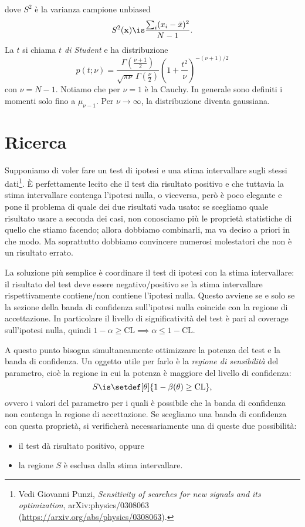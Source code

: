 dove $S^2$ è la varianza campione unbiased
\begin{equation*}
	S^2(\mathbf x)
	\is \frac {\sum_i (x_i-\bar x)^2} {N-1}.
\end{equation*}
La $t$ si chiama \emph{$t$ di Student} e ha distribuzione
\begin{equation*}
	p(t;\nu)
	= \frac {\Gamma\left(\frac{\nu+1}2\right)} {\sqrt{\pi\nu}\, \Gamma\left(\frac\nu2\right)}
	\left(1+\frac{t^2}\nu\right)^{-(\nu+1)/2}
\end{equation*}
con $\nu=N-1$.
Notiamo che per $\nu=1$ è la Cauchy.
In generale sono definiti i momenti solo fino a $\mu_{\nu-1}$.
Per $\nu\to\infty$, la distribuzione diventa gaussiana.

\section{Ricerca}

Supponiamo di voler fare un test di ipotesi e una stima intervallare sugli stessi dati\footnote{Vedi Giovanni Punzi, \emph{Sensitivity of searches for new signals and its optimization}, 	arXiv:physics/0308063 (\url{https://arxiv.org/abs/physics/0308063}).}.
È perfettamente lecito che il test dia risultato positivo
e che tuttavia la stima intervallare contenga l'ipotesi nulla, o viceversa,
però è poco elegante e pone il problema di quale dei due risultati vada usato:
se scegliamo quale risultato usare a seconda dei casi,
non conosciamo più le proprietà statistiche di quello che stiamo facendo;
allora dobbiamo combinarli, ma va deciso a priori in che modo.
Ma soprattutto dobbiamo convincere numerosi molestatori che non è un risultato errato.

La soluzione più semplice è coordinare il test di ipotesi con la stima intervallare:
il risultato del test deve essere negativo/positivo
se la stima intervallare rispettivamente contiene/non contiene l'ipotesi nulla.
Questo avviene se e solo se
la sezione della banda di confidenza sull'ipotesi nulla
coincide con la regione di accettazione.
In particolare il livello di significatività del test è pari al coverage sull'ipotesi nulla,
quindi $1-\alpha\ge\mathrm{CL} \implies \alpha\le1-\mathrm{CL}$.

A questo punto bisogna simultaneamente ottimizzare la potenza del test e la banda di confidenza.
Un oggetto utile per farlo è la \emph{regione di sensibilità} del parametro,
cioè la regione in cui la potenza è maggiore del livello di confidenza:
\begin{equation*}
	S \is \setdef[\theta]{1-\beta(\theta) \ge \mathrm{CL}},
\end{equation*}
ovvero i valori del parametro per i quali è possibile
che la banda di confidenza non contenga la regione di accettazione.
Se scegliamo una banda di confidenza con questa proprietà,
si verificherà necessariamente una di queste due possibilità:
\begin{itemize}
	\item il test dà risultato positivo, oppure
	\item la regione $S$ è esclusa dalla stima intervallare.
\end{itemize}
